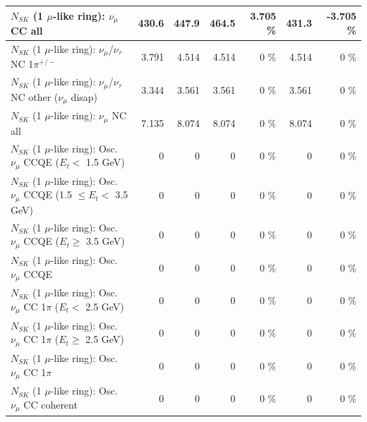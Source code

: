\begin{table}
\begin{tabular}{| l | r | r | r  r | r  r |}
                                $N_{SK}$ (1 $\mu$-like ring): $\nu_{\mu}$ CC all &           430.6 &           447.9 &           464.5 &    3.705 \%  &           431.3 &   -3.705 \%  \\ 
\hline
              $N_{SK}$ (1 $\mu$-like ring): $\nu_\mu$/$\nu_\tau$ NC 1$\pi^{+/-}$ &           3.791 &           4.514 &           4.514 &        0 \%  &           4.514 &        0 \%  \\ 
   $N_{SK}$ (1 $\mu$-like ring): $\nu_\mu$/$\nu_\tau$ NC other ($\nu_\mu$ disap) &           3.344 &           3.561 &           3.561 &        0 \%  &           3.561 &        0 \%  \\ 
                                $N_{SK}$ (1 $\mu$-like ring): $\nu_{\mu}$ NC all &           7.135 &           8.074 &           8.074 &        0 \%  &           8.074 &        0 \%  \\ 
\hline
\hline
           $N_{SK}$ (1 $\mu$-like ring): Osc. $\nu_\mu$ CCQE ($E_{t} <$ 1.5 GeV) &               0 &               0 &               0 &        0 \%  &               0 &        0 \%  \\ 
  $N_{SK}$ (1 $\mu$-like ring): Osc. $\nu_\mu$ CCQE (1.5 $\leq E_{t} <$ 3.5 GeV) &               0 &               0 &               0 &        0 \%  &               0 &        0 \%  \\ 
        $N_{SK}$ (1 $\mu$-like ring): Osc. $\nu_\mu$ CCQE ($E_{t} \geq$ 3.5 GeV) &               0 &               0 &               0 &        0 \%  &               0 &        0 \%  \\ 
\hline
                               $N_{SK}$ (1 $\mu$-like ring): Osc. $\nu_\mu$ CCQE &               0 &               0 &               0 &        0 \%  &               0 &        0 \%  \\ 
\hline
      $N_{SK}$ (1 $\mu$-like ring): Osc. $\nu_\mu$ CC 1$\pi$ ($E_{t} <$ 2.5 GeV) &               0 &               0 &               0 &        0 \%  &               0 &        0 \%  \\ 
   $N_{SK}$ (1 $\mu$-like ring): Osc. $\nu_\mu$ CC 1$\pi$ ($E_{t} \geq$ 2.5 GeV) &               0 &               0 &               0 &        0 \%  &               0 &        0 \%  \\ 
\hline
                          $N_{SK}$ (1 $\mu$-like ring): Osc. $\nu_\mu$ CC 1$\pi$ &               0 &               0 &               0 &        0 \%  &               0 &        0 \%  \\ 
                        $N_{SK}$ (1 $\mu$-like ring): Osc. $\nu_\mu$ CC coherent &               0 &               0 &               0 &        0 \%  &               0 &        0 \%  \\ 

\end{tabular}
\end{table}
